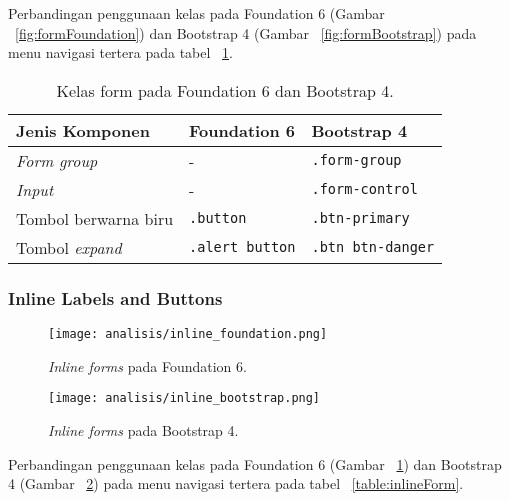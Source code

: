 \noindent Perbandingan penggunaan kelas pada Foundation 6 (Gambar ~\ref{fig:formFoundation}) dan Bootstrap 4 (Gambar ~\ref{fig:formBootstrap}) pada menu navigasi tertera pada tabel ~\ref{table:form}.\\

\begin{table}[H] 
	\caption{Kelas form pada Foundation 6 dan Bootstrap 4.}
	\begin{tabular}{| p{} | p{} | p{} |} 
		\hline
		\textbf{Jenis Komponen} & \textbf{Foundation 6} & \textbf{Bootstrap 4}  \\ [0.5ex] 
		\hline	
		\textit{Form group} & - & \texttt{.form-group}\\
		\hline
		\textit{Input} & - & \texttt{.form-control}\\
		\hline			
		Tombol berwarna biru & \texttt{.button} & \texttt{.btn-primary}  \\
		\hline
		Tombol \textit{expand} & \texttt{.alert button} & \texttt{.btn btn-danger} \\[1ex]
		\hline
	\end{tabular}
	\label{table:form}
\end{table}

\subsubsection{Inline Labels and Buttons}
\begin{figure} [H]
	\centering  
	\texttt{[image: analisis/inline\_foundation.png]}  
	\caption{\textit{Inline forms} pada Foundation 6.}
	\label{fig:inlineFoundation}	 
\end{figure}

\begin{figure} [H]
	\centering  
	\texttt{[image: analisis/inline\_bootstrap.png]}  
	\caption{\textit{Inline forms} pada Bootstrap 4.}
	\label{fig:inlineBootstrap}	 
\end{figure}

\noindent Perbandingan penggunaan kelas pada Foundation 6 (Gambar ~\ref{fig:inlineFoundation}) dan Bootstrap 4 (Gambar ~\ref{fig:inlineBootstrap}) pada menu navigasi tertera pada tabel ~\ref{table:inlineForm}.\\

